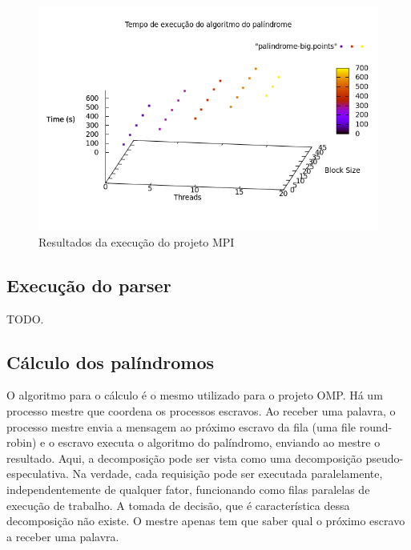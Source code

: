 \documentclass[a4paper]{article}
\begin{document}
\begin{figure}
	\includegraphics[scale=0.5]{graph-mpi}
	\caption{Resultados da execução do projeto MPI}
	\label{graph-mpi}
\end{figure}

\subsection{Execução do parser}
\indent \indent TODO.

\subsection{Cálculo dos palíndromos}
\indent \indent O algoritmo para o cálculo é o mesmo utilizado para o projeto OMP. Há um processo mestre que coordena os processos escravos. Ao receber uma palavra, o processo mestre envia a mensagem ao próximo escravo da fila (uma file round-robin) e o escravo executa o algoritmo do palíndromo, enviando ao mestre o resultado. Aqui, a decomposição pode ser vista como uma decomposição pseudo-especulativa. Na verdade, cada requisição pode ser executada paralelamente, independentemente de qualquer fator, funcionando como filas paralelas de execução de trabalho. A tomada de decisão, que é característica dessa decomposição não existe. O mestre apenas tem que saber qual o próximo escravo a receber uma palavra.
\end{document}

